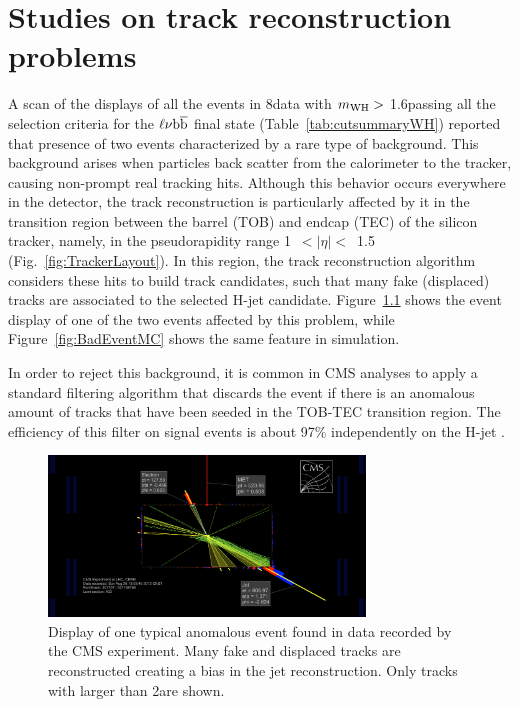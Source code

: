 \chapter{Studies on track reconstruction problems}\label{app:tobtec}

A scan of the displays of all the events in 8\TeV data with $m_{\rm WH} >$ 1.6\TeV passing all the selection criteria for the $\ell\nu{\mathrm{b}\overline{\mathrm{b}}}$ final state (Table~\ref{tab:cutsummaryWH})
reported that presence of two events characterized by a rare type of background.
This background arises when particles back scatter from the calorimeter to the tracker, causing non-prompt real tracking hits.
Although this behavior occurs everywhere in the detector, the track reconstruction is particularly affected by it in the transition region between the barrel (TOB) and endcap (TEC) of the silicon tracker, namely, in the pseudorapidity range 1~$<|\eta|<$~1.5 (Fig.~\ref{fig:TrackerLayout}).
In this region, the track reconstruction algorithm considers these hits to build track candidates, such that many fake (displaced) tracks are associated to the selected H-jet candidate.
Figure~\ref{fig:BadEventData} shows the event display of one of the two events
affected by this problem, while Figure~\ref{fig:BadEventMC} shows the same feature in simulation.

In order to reject this background, it is common in CMS analyses to apply a standard filtering algorithm that discards the event if 
there is an anomalous amount of tracks that have been seeded in the TOB-TEC transition region.
The efficiency of this filter on signal events is about 97\% independently on the H-jet \pt.

\begin{figure}[!htb]
\centering
\includegraphics[width=0.75\textwidth]{Appendix/Figures/SingleEleC_Run201707_Event527168766_Lumi403_badEvent.png}
\caption{Display of one typical anomalous event found in data recorded by the CMS experiment. 
Many fake and displaced tracks are reconstructed creating a bias in the jet reconstruction.
Only tracks with \pt larger than 2\GeV are shown.}
\label{fig:BadEventData}
\end{figure}

